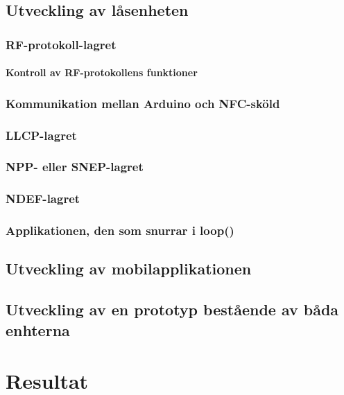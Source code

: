 \documentclass[11pt]{article}
\begin{document}
\subsection{Utveckling av låsenheten}

\subsubsection{RF-protokoll-lagret}

\paragraph{Kontroll av RF-protokollens funktioner}

\subsubsection{Kommunikation mellan Arduino och NFC-sköld}

\subsubsection{LLCP-lagret}

\subsubsection{NPP- eller SNEP-lagret}

\subsubsection{NDEF-lagret}

\subsubsection{Applikationen, den som snurrar i loop()}

\subsection{Utveckling av mobilapplikationen}

\subsection{Utveckling av en prototyp bestående av båda enhterna}

\section{Resultat}
\end{document}
